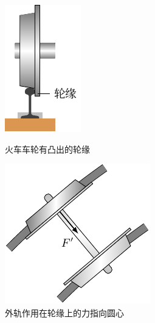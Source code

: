 \begin{figure}[htbp]
    \centering
    \begin{minipage}[t]{0.48\textwidth}
        \centering
        \includegraphics{fig/A/4-25.pdf}
        \caption{火车车轮有凸出的轮缘}\label{fig_A_4-25}
    \end{minipage}
    \begin{minipage}[t]{0.49\textwidth}
        \centering
        \includegraphics{fig/A/4-26.pdf}
        \caption{外轨作用在轮缘上的力指向圆心}\label{fig_A_4-26}
    \end{minipage}
\end{figure}

